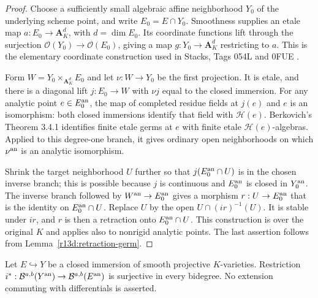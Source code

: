 \begin{proof}
Choose a sufficiently small algebraic affine neighborhood $Y_0$
of the underlying scheme point, and write $E_0=E\cap Y_0$.
Smoothness supplies an etale map
$a:E_0\to\mathbf A_K^d$, with $d=\dim E_0$.
Its coordinate functions lift through the surjection
$\mathcal O(Y_0)\to\mathcal O(E_0)$, giving a map
$g:Y_0\to\mathbf A_K^d$ restricting to $a$.
This is the elementary coordinate construction used in Stacks,
Tags 054L and 0FUE \cite{Stacks}.

Form $W=Y_0\times_{\mathbf A_K^d}E_0$ and let
$\nu:W\to Y_0$ be the first projection.  It is etale, and there
is a diagonal lift $j:E_0\to W$ with $\nu j$ equal to the closed
immersion.  For any analytic point $e\in E_0^{\rm an}$, the map
of completed residue fields at $j(e)$ and $e$ is an isomorphism:
both closed immersions identify that field with $\mathscr H(e)$.
Berkovich's Theorem 3.4.1 \cite{BerEt} identifies finite etale
germs at $e$ with finite etale $\mathscr H(e)$-algebras.  Applied
to this degree-one branch, it gives ordinary open neighborhoods
on which $\nu^{\rm an}$ is an analytic isomorphism.

Shrink the target neighborhood $U$ further so that
$j(E_0^{\rm an}\cap U)$ is in the chosen inverse branch; this is
possible because $j$ is continuous and $E_0^{\rm an}$ is closed
in $Y_0^{\rm an}$.  The inverse branch followed by $W^{\rm an}\to
E_0^{\rm an}$ gives a morphism $r:U\to E_0^{\rm an}$ that is the
identity on $E_0^{\rm an}\cap U$.  Replace $U$ by the open
$U\cap (ir)^{-1}(U)$.  It is stable under $ir$, and $r$ is then
a retraction onto $E_0^{\rm an}\cap U$.  This construction is over
the original $K$ and applies also to nonrigid analytic points.
The last assertion follows from Lemma~\ref{r13d:retraction-germ}.
\end{proof}

\begin{lemma}
\label{r13d:restriction-surjective}
Let $E\hookrightarrow Y$ be a closed immersion of smooth projective
$K$-varieties.  Restriction
$i^*:\mathcal B^{a,b}(Y^{\rm an})\to\mathcal B^{a,b}(E^{\rm an})$
is surjective in every bidegree.  No extension commuting with
differentials is asserted.
\end{lemma}

